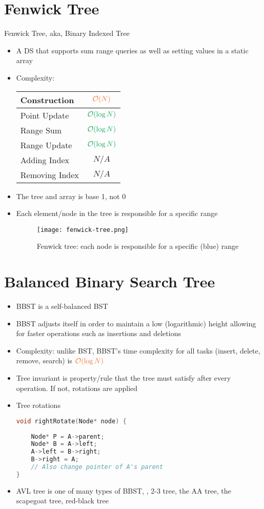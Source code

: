 \section{Fenwick Tree}
Fenwick Tree, \ac{aka}, Binary Indexed Tree \cite{fenwick1994new}
\begin{itemize}
	\item A \ac{DS} that supports sum range queries as well as setting values in a static array
	\item Complexity:
	\begin{center}
		\begin{tabular}{|l|c|}
			\hline
			Construction & $ \color{Orange} \mathcal{O}(N) $ \\ \hline
			Point Update & $ \color{Green} \mathcal{O} (\log N) $ \\ \hline
			Range Sum & $ \color{Green} \mathcal{O} (\log N) $ \\ \hline
			Range Update & $ \color{Green} \mathcal{O} (\log N) $ \\ \hline
			Adding Index & \color{Red} $ N/A $ \\ \hline
			Removing Index & \color{Red} $ N/A $ \\ \hline
		\end{tabular}
	\end{center}
	\item The tree and array is base 1, not 0
	\item Each element/node in the tree is responsible for a specific range
	\begin{figure}[hbt!]
		\centering
		\texttt{[image: fenwick-tree.png]}
		\caption{Fenwick tree: each node is responsible for a specific (blue) range}
	\end{figure}
\end{itemize}

\section{Balanced Binary Search Tree}
\begin{itemize}
	\item \ac{BBST} is a self-balanced \ac{BST}
	\item \ac{BBST} adjusts itself in order to maintain a low (logarithmic) height allowing for faster operations such as insertions and deletions
	\item Complexity: unlike \ac{BST}, \ac{BBST}'s time complexity for all tasks (insert, delete, remove, search) is $ \color{Orange} \mathcal{O}(\log N) $
	\item Tree invariant is property/rule that the tree must satisfy after every operation. If not, rotations are applied
	\item Tree rotations
\begin{lstlisting}[language=C++]
void rightRotate(Node* node) {
	
	Node* P = A->parent;
	Node* B = A->left;
	A->left = B->right;
	B->right = A;
	// Also change pointer of A's parent
}
\end{lstlisting}
	\item AVL tree is one of many types of \ac{BBST}, \eg, 2-3 tree, the AA tree, the scapegoat tree, red-black tree
\end{itemize}

